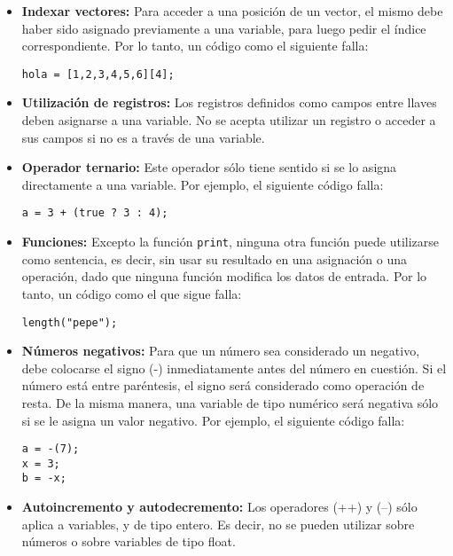 \begin{itemize}
	\item {\bf Indexar vectores: } Para acceder a una posición de un vector, el mismo debe haber sido asignado previamente a una variable, para luego pedir el índice correspondiente.  Por lo tanto, un código como el siguiente falla:
\begin{lstlisting}
hola = [1,2,3,4,5,6][4];
\end{lstlisting}
	\item {\bf Utilización de registros: } Los registros definidos como campos entre llaves deben asignarse a una variable.  No se acepta utilizar un registro o acceder a sus campos si no es a través de una variable.
	\item {\bf Operador ternario: } Este operador sólo tiene sentido si se lo asigna directamente a una variable.  Por ejemplo, el siguiente código falla:
\begin{lstlisting}
a = 3 + (true ? 3 : 4);
\end{lstlisting}
	\item {\bf Funciones: } Excepto la función {\tt print}, ninguna otra función puede utilizarse como sentencia, es decir, sin usar su resultado en una asignación o una operación, dado que ninguna función modifica los datos de entrada.  Por lo tanto, un código como el que sigue falla:
\begin{lstlisting}
length("pepe");
\end{lstlisting}
	\item {\bf Números negativos: } Para que un número sea considerado un negativo, debe colocarse el signo (-) inmediatamente antes del número en cuestión.  Si el número está entre paréntesis, el signo será considerado como operación de resta.  De la misma manera, una variable de tipo numérico será negativa sólo si se le asigna un valor negativo. Por ejemplo, el siguiente código falla:
\begin{lstlisting}
a = -(7);
x = 3;
b = -x;
\end{lstlisting}
	\item {\bf Autoincremento y autodecremento: } Los operadores (++) y (--) sólo aplica a variables, y de tipo entero.  Es decir, no se pueden utilizar sobre números o sobre variables de tipo float.
\end{itemize}